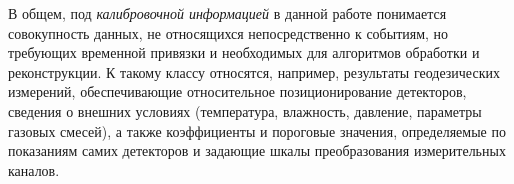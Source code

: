 %
%
%
В общем, под \emph{калибровочной информацией} в данной работе понимается
совокупность данных, не относящихся непосредственно к событиям, но
требующих временной привязки и необходимых для алгоритмов обработки и
реконструкции. К такому классу относятся, например, результаты геодезических
измерений, обеспечивающие относительное позиционирование детекторов,
сведения о внешних условиях (температура, влажность, давление, параметры
газовых смесей), а также коэффициенты и пороговые значения, определяемые
по показаниям самих детекторов и задающие шкалы преобразования
измерительных каналов.

